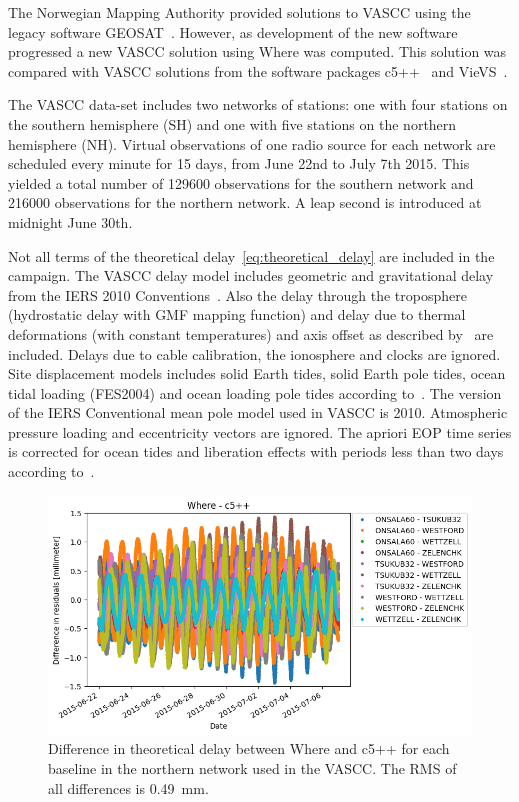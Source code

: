 \documentclass[natbib,twocolumn,twoside]{svmultiag}
\begin{document}
The Norwegian Mapping Authority provided solutions to VASCC using the legacy
software GEOSAT~\citep{kierulf2010}. However, as development of the new software
progressed a new VASCC solution using Where was computed. This solution was
compared with VASCC solutions from the software packages
c5++~\citep{hobiger2010} and VieVS~\citep{boehm2012}.

The VASCC data-set includes two networks of stations: one with four stations on
the southern hemisphere (SH) and one with five stations on the northern
hemisphere (NH).  Virtual observations of one radio source for each network are
scheduled every minute for 15 days, from June 22nd to July 7th 2015. This
yielded a total number of 129600 observations for the southern network and
216000 observations for the northern network. A leap second is introduced at
midnight June 30th.

Not all terms of the theoretical delay~\eqref{eq:theoretical_delay} are included
in the campaign. The VASCC delay model includes geometric and gravitational
delay from the IERS 2010 Conventions~\citep{iers2010}. Also the delay through
the troposphere~\citep{iers2010} (hydrostatic delay with GMF mapping function)
and delay due to thermal deformations (with constant temperatures) and axis
offset as described by~\citep{nothnagel2009} are included. Delays due to cable
calibration, the ionosphere and clocks are ignored. Site displacement models
includes solid Earth tides, solid Earth pole tides, ocean tidal loading
(FES2004) and ocean loading pole tides according to~\citep{iers2010}. The
version of the IERS Conventional mean pole model used in VASCC is
2010. Atmospheric pressure loading and eccentricity vectors are ignored. The
apriori EOP time series is corrected for ocean tides and liberation effects with
periods less than two days according to~\citep{iers2010}.

\begin{figure}[tb]
  \includegraphics[width=\columnwidth]{kirkvik_fig03}
  \caption{Difference in theoretical delay between Where and c5++ for each
    baseline in the northern network used in the VASCC. The RMS of all
    differences is 0.49~mm.}
  \label{fig:where_c5++_sh}
\end{figure}
\end{document}
